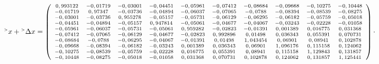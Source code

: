 \documentclass[12pt]{article}
\begin{document}
\begin{equation*}
	\scriptsize
	{}^{\mathsmaller{>}} x + {}^{\mathsmaller{>}} \Delta x = 
		\left(
	\begin{array}{cccccccccc}
		0,993122 & -0,01719 & -0,03001 & -0,04451 & -0,05961 & -0,07412 & -0,08684 & -0,09668 & -0,10275 & -0,10448 \\
		-0,01719 & 0,97347 & -0,03736 & -0,04894 & -0,06037 & -0,07065 & -0,0788 & -0,08394 & -0,08539 & -0,08275 \\
		-0,03001 & -0,03736 & 0,955278 & -0,05157 & -0,05731 & -0,06129 & -0,06295 & -0,06182 & -0,05759 & -0,05018 \\
		-0,04451 & -0,04894 & -0,05157 & 0,947814 & -0,05061 & -0,04677 & -0,04067 & -0,03243 & -0,02228 & -0,01058 \\
		-0,05961 & -0,06037 & -0,05731 & -0,05061 & 0,959282 & -0,02823 & -0,01391 & 0,001389 & 0,016775 & 0,031368 \\
		-0,07412 & -0,07065 & -0,06129 & -0,04677 & -0,02823 & 0,992896 & 0,01498 & 0,036343 & 0,055391 & 0,070731 \\
		-0,08684 & -0,0788 & -0,06295 & -0,04067 & -0,01391 & 0,01498 & 1,043454 & 0,06901 & 0,08941 & 0,102878 \\
		-0,09668 & -0,08394 & -0,06182 & -0,03243 & 0,001389 & 0,036343 & 0,06901 & 1,096176 & 0,115158 & 0,124062 \\
		-0,10275 & -0,08539 & -0,05759 & -0,02228 & 0,016775 & 0,055391 & 0,08941 & 0,115158 & 1,129843 & 0,131857 \\
		-0,10448 & -0,08275 & -0,05018 & -0,01058 & 0,031368 & 0,070731 & 0,102878 & 0,124062 & 0,131857 & 1,125441 
	\end{array}
	\right)
	\cdot
\end{equation*}
\end{document}
